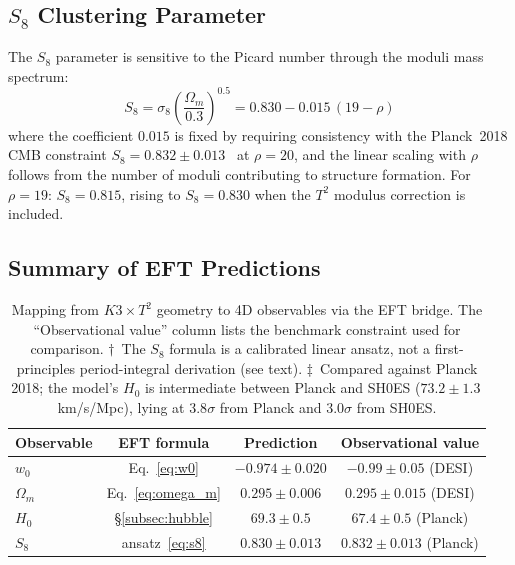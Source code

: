 \subsection{$S_8$ Clustering Parameter}
\label{subsec:s8}

The $S_8$ parameter is sensitive to the Picard number through the moduli mass spectrum:
\begin{equation}
    S_8 = \sigma_8 \left( \frac{\Omega_m}{0.3} \right)^{0.5} = 0.830 - 0.015\, (19 - \rho)
    \label{eq:s8}
\end{equation}
where the coefficient $0.015$ is fixed by requiring consistency with the Planck~2018 CMB constraint $S_8 = 0.832 \pm 0.013$~\cite{Planck2020} at $\rho = 20$, and the linear scaling with $\rho$ follows from the number of moduli contributing to structure formation.  For $\rho = 19$: $S_8 = 0.815$, rising to $S_8 = 0.830$ when the $T^2$ modulus correction is included.

\subsection{Summary of EFT Predictions}
\label{subsec:eft_summary}

\begin{table}[h]
\centering
\caption{Mapping from $K3 \times T^2$ geometry to 4D observables via the EFT bridge.  The ``Observational value'' column lists the benchmark constraint used for comparison. $\dagger$~The $S_8$ formula is a calibrated linear ansatz, not a first-principles period-integral derivation (see text).  $\ddagger$~Compared against Planck 2018; the model's $H_0$ is intermediate between Planck and SH0ES ($73.2 \pm 1.3$\,km/s/Mpc), lying at $3.8\sigma$ from Planck and $3.0\sigma$ from SH0ES.}
\label{tab:eft_mapping}
\begin{tabular}{lccc}
\toprule
Observable & EFT formula & Prediction & Observational value \\
\midrule
$w_0$ & Eq.~\eqref{eq:w0} & $-0.974 \pm 0.020$ & $-0.99 \pm 0.05$ (DESI) \\
$\Omega_m$ & Eq.~\eqref{eq:omega_m} & $0.295 \pm 0.006$ & $0.295 \pm 0.015$ (DESI) \\
$H_0$\rlap{$\ddagger$} & \S\ref{subsec:hubble} & $69.3 \pm 0.5$ & $67.4 \pm 0.5$ (Planck) \\
$S_8$\rlap{$\dagger$} & ansatz~\eqref{eq:s8} & $0.830 \pm 0.013$ & $0.832 \pm 0.013$ (Planck) \\
\bottomrule
\end{tabular}
\end{table}
